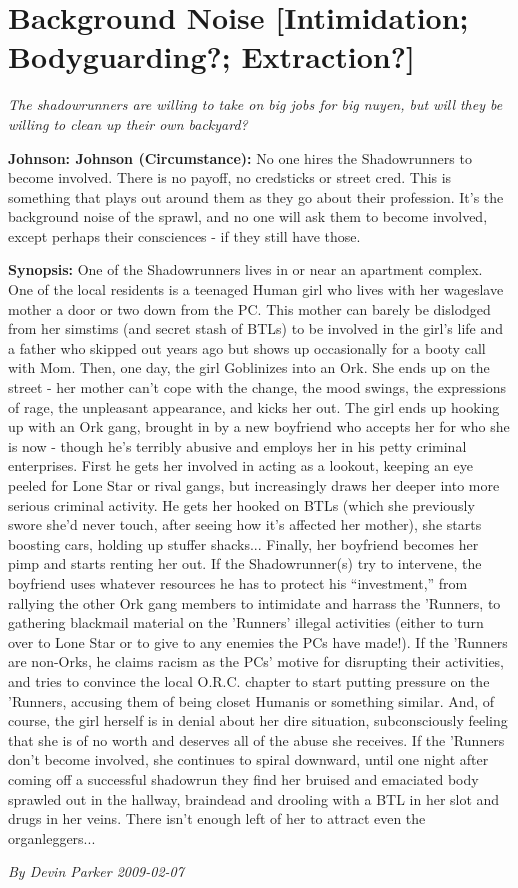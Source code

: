 \documentclass[letterpaper,twocolumn,10.5pt]{article}
\newenvironment{scenario}[6]
	{
		\section{#1 {\small[#2]}}
		\textit{#3}
		\def\TMPSCENARIO{#4 #5}
	}
	{\small\textit{By \TMPSCENARIO}}
\newcommand{\johnson}[2]{\textbf{Johnson: #1 (#2):}}
\newcommand{\synopsis}{\textbf{Synopsis: }}
\begin{document}
\begin{scenario}{Background Noise}
	{Intimidation; Bodyguarding?; Extraction?}
	{ The shadowrunners are willing to take on big jobs for big nuyen, but will they be willing to clean up their own backyard?}
	{Devin Parker}
	{2009-02-07}
	{https://forum.rpg.net/showthread.php?321504-Shadowrun-4th-101-Instant-Scenarios\&p=9948465#post9948465}

\johnson{Johnson}{Circumstance} 
No one hires the Shadowrunners to become involved. There is no payoff, no credsticks or street cred. This is something that plays out around them as they go about their profession. It's the background noise of the sprawl, and no one will ask them to become involved, except perhaps their consciences - if they still have those.

\synopsis One of the Shadowrunners lives in or near an apartment complex. One of the local residents is a teenaged Human girl who lives with her wageslave mother a door or two down from the PC. This mother can barely be dislodged from her simstims (and secret stash of BTLs) to be involved in the girl's life and a father who skipped out years ago but shows up occasionally for a booty call with Mom. Then, one day, the girl Goblinizes into an Ork. She ends up on the street - her mother can't cope with the change, the mood swings, the expressions of rage, the unpleasant appearance, and kicks her out. The girl ends up hooking up with an Ork gang, brought in by a new boyfriend who accepts her for who she is now - though he's terribly abusive and employs her in his petty criminal enterprises. First he gets her involved in acting as a lookout, keeping an eye peeled for Lone Star or rival gangs, but increasingly draws her deeper into more serious criminal activity. He gets her hooked on BTLs (which she previously swore she'd never touch, after seeing how it's affected her mother), she starts boosting cars, holding up stuffer shacks... Finally, her boyfriend becomes her pimp and starts renting her out. If the Shadowrunner(s) try to intervene, the boyfriend uses whatever resources he has to protect his ``investment,'' from rallying the other Ork gang members to intimidate and harrass the 'Runners, to gathering blackmail material on the 'Runners' illegal activities (either to turn over to Lone Star or to give to any enemies the PCs have made!). If the 'Runners are non-Orks, he claims racism as the PCs' motive for disrupting their activities, and tries to convince the local O.R.C. chapter to start putting pressure on the 'Runners, accusing them of being closet Humanis or something similar. And, of course, the girl herself is in denial about her dire situation, subconsciously feeling that she is of no worth and deserves all of the abuse she receives. If the 'Runners don't become involved, she continues to spiral downward, until one night after coming off a successful shadowrun they find her bruised and emaciated body sprawled out in the hallway, braindead and drooling with a BTL in her slot and drugs in her veins. There isn't enough left of her to attract even the organleggers...


\end{scenario}
\end{document}
